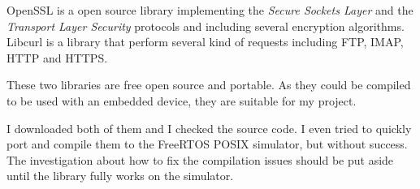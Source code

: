 OpenSSL is a open source library implementing the \textit{Secure Sockets Layer} and the \textit{Transport Layer Security} protocols and including several encryption algorithms. Libcurl is a library that perform several kind of requests including FTP, IMAP, HTTP and HTTPS.

These two libraries are free open source and portable. As they could be compiled to be used with an embedded device, they are suitable for my project.

I downloaded both of them and I checked the source code. I even tried to quickly port and compile them to the FreeRTOS POSIX simulator, but without success. The investigation about how to fix the compilation issues should be put aside until the library fully works on the simulator.


\clearpage